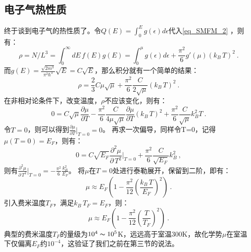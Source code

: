\subsection{电子气热性质}
终于谈到电子气的热性质了。令$Q(E)=\int_0^{E} g(\epsilon)d\epsilon$代入\autoref{eq_SMFM_2} ，则有：
\begin{equation}
\rho=N/L^3=\int_0^{\infty} dE\,f(E)g(E)=\int_0^{\mu} g(\epsilon)d\epsilon+\frac{\pi^2}{6}g'(\mu)(k_B\,T)^2~.
\end{equation}
而$g(E)=\frac{\sqrt{2m^3}}{\pi^2\hbar^3}\sqrt{E}=C\sqrt{E}$，那么积分就有一个简单的结果：
\begin{equation}
\rho=\frac{2}{3}C\mu\sqrt{\mu}+\frac{\pi^2}{6}\frac{C}{2\sqrt{\mu}}(k_B\,T)^2~.
\end{equation}
在非相对论条件下，改变温度，$\rho$不应该变化，则有：
\begin{equation}
0=C\sqrt{\mu}\frac{\partial \mu}{\partial T} -\frac{\pi^2}{6}\frac{C}{4\mu\sqrt{\mu}}\frac{\partial \mu}{\partial T}(k_B\,T)^2+\frac{\pi^2}{6}\frac{C}{\sqrt{\mu}}k_B^2  T~.
\end{equation}
令$T=0$，则可以得到$\frac{\partial \mu}{\partial T}\bigg|_{T=0}=0$。
再求一次偏导，同样令T=0，记得$\mu(T=0)=E_F$，则有：
\begin{equation}
0=C\sqrt{E_F}\frac{\partial ^2\mu}{\partial\, T^2}\bigg|_{T=0}+\frac{\pi^2}{6}\frac{C}{\sqrt{E_F}}k_B^2~,
\end{equation}
则有$\frac{\partial ^2\mu}{\partial\, T^2}\bigg|_{T=0}=-\frac{\pi^2}{6}\frac{k_B^2}{E_F}$。
将$\mu$在$T=0$处进行泰勒展开，保留到二阶，即有：
\begin{equation}
\mu\approx E_F\left(1-\frac{\pi^2}{12}(\frac{k_B\,T}{E_F})^2\right)~.
\end{equation}
引入费米温度$T_F$，满足$k_B\,T_F=E_F$，则：
\begin{equation}\label{eq_SMFM_3}
\mu\approx E_F\left(1-\frac{\pi^2}{12}(\frac{T}{T_F})^2\right)~.
\end{equation}
典型的费米温度$T_F$的量级为$10^4\thicksim 10^5$K，远远高于室温300K，故化学势$\mu$在室温下仅偏离$E_F$约$10^{-4}$，这验证了我们之前在第三节的说法。

